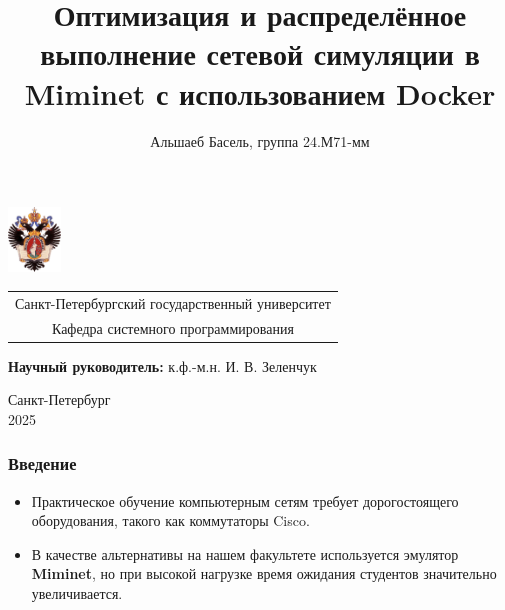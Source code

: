 \documentclass{beamer}
\title[Оптимизация Miminet]{Оптимизация и распределённое выполнение сетевой симуляции в Miminet с использованием Docker}
\institute[СПбГУ]{}
\author[Альшаеб Басель]{Альшаеб Басель, группа 24.М71-мм}
\begin{document}
{
\begin{frame}
  \includegraphics[width=1.4cm]{pictures/SPbGU_Logo.png}
\vspace{-35pt}
\hspace{-10pt}
\begin{center}
   \begin{tabular}{c}
        \scriptsize{Санкт-Петербургский государственный университет} \\
        \scriptsize{Кафедра системного программирования}
    \end{tabular}
\titlepage
\end{center}

\btVFill

{\scriptsize
   \textbf{Научный руководитель:} к.ф.-м.н. И. В. Зеленчук \\
 }
\begin{center}
  \vspace{5pt}
  \scriptsize{Санкт-Петербург\\
                 2025}
  \end{center}

\end{frame}
}

\begin{frame}[fragile]
  \frametitle{Введение}
  \begin{itemize}
    \item Практическое обучение компьютерным сетям требует дорогостоящего оборудования, такого как коммутаторы Cisco.
    \item В качестве альтернативы на нашем факультете используется эмулятор \textbf{Miminet}, но при высокой нагрузке время ожидания студентов значительно увеличивается.
  \end{itemize}
\end{frame}

\end{document}
